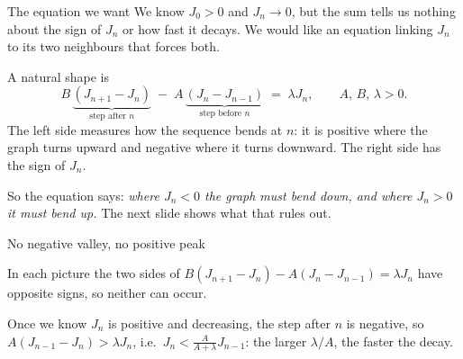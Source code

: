 \documentclass[aspectratio=169,11pt]{beamer}
\begin{document}
\begin{frame}{The equation we want}
  We know $J_0>0$ and $J_n\to0$, but the sum tells us nothing about the sign of $J_n$ or how fast
  it decays. We would like an equation linking $J_n$ to its two neighbours that forces both.
  \medskip

  A natural shape is
  \[
    B\,\underbrace{(J_{n+1}-J_n)}_{\text{step after }n}\;-\;A\,\underbrace{(J_n-J_{n-1})}_{\text{step before }n}\;=\;\lambda J_n,
    \qquad A,\,B,\,\lambda>0 .
  \]
  The left side measures how the sequence bends at $n$: it is positive where the graph turns
  upward and negative where it turns downward. The right side has the sign of $J_n$.
  \medskip

  So the equation says: \emph{where $J_n<0$ the graph must bend down, and where $J_n>0$ it must
  bend up.} The next slide shows what that rules out.
\end{frame}

\begin{frame}{No negative valley, no positive peak}
  \centering
  \medskip

  \raggedright
  In each picture the two sides of $B(J_{n+1}-J_n)-A(J_n-J_{n-1})=\lambda J_n$ have opposite
  signs, so neither can occur.
  \pause

  Once we know $J_n$ is positive and decreasing, the step after $n$ is negative, so
  $A(J_{n-1}-J_n)>\lambda J_n$, i.e.\ $J_n<\frac{A}{A+\lambda}J_{n-1}$: the larger $\lambda/A$,
  the faster the decay.
\end{frame}
\end{document}
